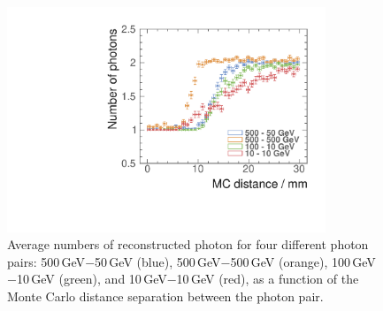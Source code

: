 \begin{figure}[tbph]
\centering
        \includegraphics[width=0.85\textwidth]{photon/DoubleCompareEnergies.pdf}
        \caption{Average numbers of reconstructed photon for four different photon pairs: 500\,GeV$-$50\,GeV (blue), 500\,GeV$-$500\,GeV (orange), 100\,GeV$-$10\,GeV (green), and 10\,GeV$-$10\,GeV (red), as a function of the Monte Carlo distance separation between the photon pair.}
        \label{fig:photonDoubleCompareEnergies}
\end{figure}

